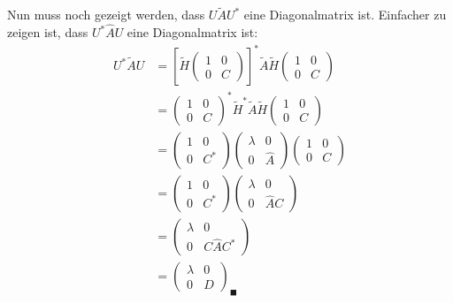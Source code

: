 \documentclass[11pt]{article}
\theoremstyle{plain}
\theoremstyle{definition}
\begin{document}
\begin{itemize}
Nun muss noch gezeigt werden, dass $U\tilde{A}U^*$ eine Diagonalmatrix ist. Einfacher zu zeigen ist, dass $U^*\hat{A}U$ eine Diagonalmatrix ist:
\begin{align*}
U^*\tilde{A}U 
&= 
\left[
\tilde{H}
\begin{pmatrix}
1 & 0 \\
0 & C
\end{pmatrix}\right]^*
\tilde{A}
\tilde{H}
\begin{pmatrix}
1 & 0 \\
0 & C
\end{pmatrix}\\
&=
\begin{pmatrix}
1 & 0 \\
0 & C
\end{pmatrix}^*
\tilde{H}^*
\tilde{A}
\tilde{H}
\begin{pmatrix}
1 & 0 \\
0 & C
\end{pmatrix}\\
&=
\begin{pmatrix}
1 & 0 \\
0 & C^*
\end{pmatrix}
\begin{pmatrix}
\lambda & 0\\
0 & \hat{A}
\end{pmatrix}
\begin{pmatrix}
1 & 0 \\
0 & C
\end{pmatrix}\\
&=
\begin{pmatrix}
1 & 0 \\
0 & C^*
\end{pmatrix}
\begin{pmatrix}
\lambda & 0\\
0 & \hat{A}C
\end{pmatrix}\\
&=
\begin{pmatrix}
\lambda & 0\\
0 & C\hat{A}C^*
\end{pmatrix}\\
&=
\begin{pmatrix}
\lambda & 0\\
0 & D
\end{pmatrix} _\blacksquare
\end{align*} 

\end{itemize}
\end{document}
